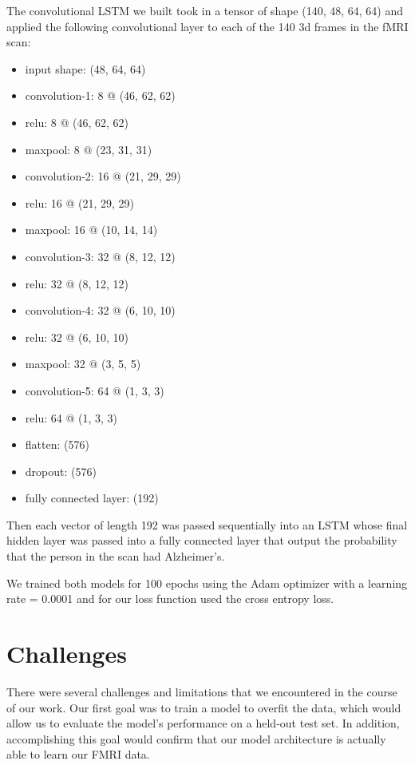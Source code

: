 \documentclass[11pt]{article}
\begin{document}
	The convolutional LSTM we built took in a tensor of shape 
	(140, 48, 64, 64) and applied the following convolutional layer to each of the 140 3d frames in the fMRI scan:
		\begin{itemize}
			\item input shape: (48, 64, 64)
			\item convolution-1: 8 @ (46, 62, 62)
			\item relu: 8 @ (46, 62, 62)
			\item maxpool: 8 @ (23, 31, 31)
			\item convolution-2: 16 @ (21, 29, 29)
			\item relu: 16 @ (21, 29, 29)
			\item maxpool: 16 @ (10, 14, 14)
			\item convolution-3: 32 @ (8, 12, 12)
			\item relu: 32 @ (8, 12, 12)
			\item convolution-4: 32 @ (6, 10, 10)
			\item relu: 32 @ (6, 10, 10)
			\item maxpool: 32 @ (3, 5, 5)
			\item convolution-5: 64 @ (1, 3, 3)
			\item relu: 64 @ (1, 3, 3)
			\item flatten: (576)
			\item dropout: (576)
			\item fully connected layer: (192)
	\end{itemize}

	Then each vector of length 192 was passed sequentially into an LSTM whose final hidden layer was passed into a fully connected layer that output the probability that the person in the scan had Alzheimer's.

	We trained both models for 100 epochs using the Adam optimizer with a learning rate = 0.0001 and for our loss function used the cross entropy loss. 


	\section{Challenges}
	\label{sec:challenges}

	There were several challenges and limitations that we encountered in the course of our work. Our first goal was to train a model to overfit the data, which would allow us to evaluate the model's performance on a held-out test set. In addition, accomplishing this goal would confirm that our model architecture is actually able to learn our FMRI data.
\end{document}
